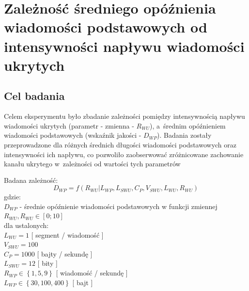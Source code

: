 \documentclass[a4paper, twoside, 12pt]{report}
\begin{document}
    \section{Zależność średniego opóźnienia wiadomości podstawowych od intensywności napływu wiadomości ukrytych} \label{OPOZNIENEPODSTAWOWYCHODUKRYTYCH}
        \subsection{Cel badania}
            Celem eksperymentu było zbadanie zależności pomiędzy intensywnością
            napływu wiadomości ukrytych (parametr - zmienna - \( R_{WU} \)), a~średnim opóźnieniem wiadomości podstawowych (wskaźnik jakości - \( D_{WP} \)).
            Badania zostały przeprowadzone dla różnych średnich długości wiadomości
            podstawowych oraz intensywności ich napływu, co pozwoliło zaobserwować
            zróżnicowane zachowanie kanału ukrytego w~zależności od wartości tych
            parametrów

            Badana zależność: \\
                $$ D_{WP} = f(R_{WU} | L_{WP}, L_{SWU}, C_P, V_{SWU}, L_{WU}, R_{WU}) $$
            gdzie:\\
                    \( D_{WP} \) - średnie opóźnienie wiadomości podstawowych w funkcji zmiennej \( R_{WU}, R_{WU} \in [0;10] \) \\
           dla ustalonych: \\
                    \( L_{WU} = 1 \) [ segment / wiadomość ]\\
                    \( V_{SWU} = 100 \)\\
                    \( C_P = 1000 \) [ bajty / sekundę ]\\
                    \( L_{SWU} = 12 \) [ bity ]\\
                    \( R_{WP} \in \left\{ 1, 5, 9 \right\}\) [ wiadomość / sekundę ]\\
                    \( L_{WP} \in \left\{ 30, 100, 400 \right\}\) [ bajt ]\\
\end{document}
